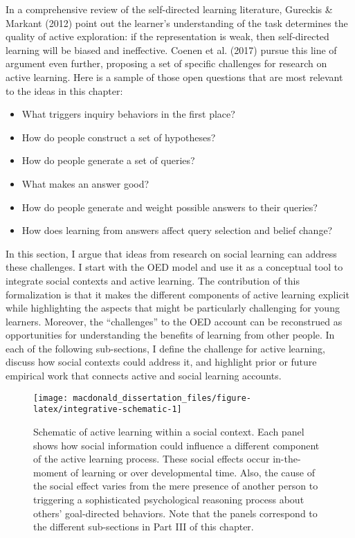 \documentclass[oneside]{report}
\begin{document}
In a comprehensive review of the self-directed learning literature,
Gureckis \& Markant (2012) point out the learner's understanding of the
task determines the quality of active exploration: if the representation
is weak, then self-directed learning will be biased and ineffective.
Coenen et al. (2017) pursue this line of argument even further,
proposing a set of specific challenges for research on active learning.
Here is a sample of those open questions that are most relevant to the
ideas in this chapter:
\begin{itemize}
\tightlist
\item
  What triggers inquiry behaviors in the first place?
\item
  How do people construct a set of hypotheses?
\item
  How do people generate a set of queries?
\item
  What makes an answer good?
\item
  How do people generate and weight possible answers to their queries?
\item
  How does learning from answers affect query selection and belief
  change?
\end{itemize}
\noindent
In this section, I argue that ideas from research on social learning can
address these challenges. I start with the OED model and use it as a
conceptual tool to integrate social contexts and active learning. The
contribution of this formalization is that it makes the different
components of active learning explicit while highlighting the aspects
that might be particularly challenging for young learners. Moreover, the
``challenges'' to the OED account can be reconstrued as opportunities
for understanding the benefits of learning from other people. In each of
the following sub-sections, I define the challenge for active learning,
discuss how social contexts could address it, and highlight prior or
future empirical work that connects active and social learning accounts.
\begin{figure}[!t]

{\centering \texttt{[image: macdonald\_dissertation\_files/figure-latex/integrative-schematic-1]} 

}

\caption[Schematic of the integrative account of active learning within a social context.]{Schematic of active learning within a social context. Each panel shows how social information could influence a different component of the active learning process. These social effects occur in-the-moment of learning or over developmental time. Also, the cause of the social effect varies from the mere presence of another person to triggering a sophisticated psychological reasoning process about others' goal-directed behaviors. Note that the panels correspond to the different sub-sections in Part III of this chapter.}\label{fig:integrative-schematic}
\end{figure}
\end{document}
